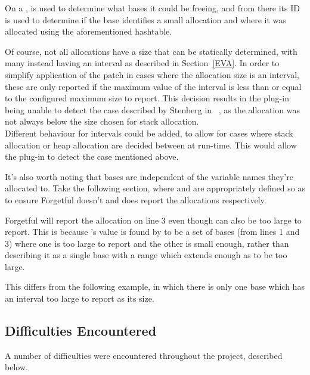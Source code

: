 On a \free{},  is used to determine what bases it could be freeing, and from there its ID is used to determine if the base identifies a small allocation and where it was allocated using the aforementioned hashtable.

Of course, not all allocations have a size that can be statically determined, with many instead having an interval as described in Section~\ref{EVA}. In order to simplify application of the patch in cases where the allocation size is an interval, these are only reported if the maximum value of the interval is less than or equal to the configured maximum size to report. This decision results in the plug-in being unable to detect the case described by Stenberg in ~\cite{curlmalloc}, as the allocation was not always below the size chosen for stack allocation.\\
Different behaviour for intervals could be added, to allow for cases where stack allocation or heap allocation are decided between at run-time. This would allow the plug-in to detect the case mentioned above.

It's also worth noting that bases are independent of the variable names they're allocated to. Take the following section, where  and  are appropriately defined so as to ensure Forgetful doesn't and does report the allocations respectively.



Forgetful will report the allocation on line 3 even though  can also be too large to report. This is because 's value is found by  to be a set of bases (from lines 1 and 3) where one is too large to report and the other is small enough, rather than describing it as a single base with a range which extends enough as to be too large.

This differs from the following example, in which there is only one base which has an interval too large to report as its size.



\subsection{Difficulties Encountered}

A number of difficulties were encountered throughout the project, described below.

